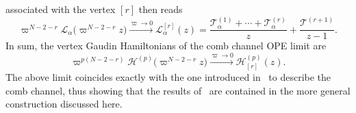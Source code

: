 \documentclass{article}
\def\Lc{\mathcal{L}}
\def\Hc{\mathcal{H}}
\begin{document}
associated with the vertex $[r]$ then reads
\begin{equation}
\varpi^{N-2-r} \Lc_\alpha \bigl( \varpi^{N-2-r} z \bigr) \xrightarrow{\varpi\to 0} \Lc_\alpha^{[r]}(z) = \frac{\mathcal{T}_\alpha^{(1)}+\cdots+\mathcal{T}_\alpha^{(r)}}{z} + \frac{\mathcal{T}^{(r+1)}}{z-1}.
\end{equation}
In sum, the vertex Gaudin Hamiltonians of the comb channel OPE limit are
\begin{equation}
\varpi^{p(N-2-r)} \Hc^{(p)} \bigl( \varpi^{N-2-r} z \bigr) \xrightarrow{\varpi\to 0} \Hc_{[r]}^{(p)}(z).
\end{equation}
The above limit coincides exactly with the one introduced in~\cite{Buric:2020dyz} to describe the comb 
channel, thus showing that the results of~\cite{Buric:2020dyz} are contained in the more general 
construction discussed here.
\medskip 
\end{document}
